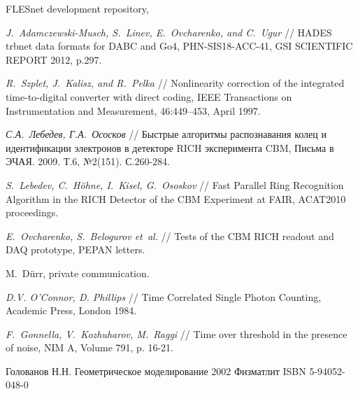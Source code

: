 \begin{thebibliography}{99}

FLESnet development repository,

\textit{J.~Adamczewski-Musch, S.~Linev, E.~Ovcharenko, and C.~Ugur} //
HADES trbnet data formats for DABC and Go4,
PHN-SIS18-ACC-41, GSI SCIENTIFIC REPORT 2012, p.297.

\textit{R.~Szplet, J.~Kalisz, and R.~Pelka} //
Nonlinearity correction of the integrated time-to-digital converter with direct coding,
IEEE Transactions on Instrumentation and Measurement, 46:449–453, April 1997.

\textit{С.А.~Лебедев, Г.А.~Ососков} //
Быстрые алгоритмы распознавания колец и идентификации электронов в детекторе RICH эксперимента CBM,
Письма в ЭЧАЯ. 2009. Т.6, №2(151). С.260-284.

\textit{S.~Lebedev, C.~H\"{o}hne, I.~Kisel, G.~Ososkov} //
Fast Parallel Ring Recognition Algorithm in the RICH Detector of the CBM Experiment at FAIR,
ACAT2010 proceedings.


\textit{E.~Ovcharenko, S.~Belogurov et~al.} //
Tests of the CBM RICH readout and DAQ prototype,
PEPAN letters.

M.~D\"urr, private communication.

\textit{D.V. O’Connor, D. Phillips} //
Time Correlated Single Photon Counting, Academic Press, London 1984.

\textit{F.~Gonnella, V.~Kozhuharov, M.~Raggi} //
Time over threshold in the presence of noise,
NIM A, Volume 791, p. 16-21.


Голованов Н.Н.
Геометрическое моделирование
2002 Физматлит ISBN 5-94052-048-0

\end{thebibliography}

